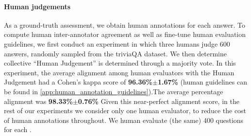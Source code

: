 \paragraph{Human judgements}
As a ground-truth assessment, we obtain human annotations for each \evaluatormodel answer.
To compute human inter-annotator agreement as well as fine-tune human evaluation guidelines, we first conduct an experiment in which three humans judge 600  \citep{touvron2023llama} answers, randomly sampled from the triviaQA \citep{joshi2017triviaqa} dataset.
We then determine collective ``Human Judgement'' is determined through a majority vote.
%
%
In this experiment, the average alignment among human evaluators with the Human Judgement had a Cohen's kappa score \citep{cohen1960kappa} of \textbf{96.36\%$\pm$1.67\%} (human guidelines can be found in \cref{app:human_annotation_guidelines}).The average percentage alignment was \textbf{98.33\%$\pm$0.76\%}
Given this near-perfect alignment score, in the rest of our experiments we consider only one human evaluator, to reduce the cost of human annotations throughout.
We human evaluate (the same) 400 questions for each \evaluatormodel.
%

